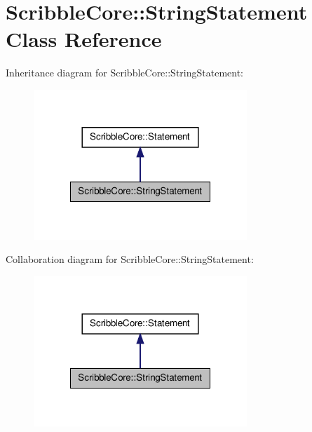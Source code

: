 \hypertarget{class_scribble_core_1_1_string_statement}{\section{Scribble\-Core\-:\-:String\-Statement Class Reference}
\label{class_scribble_core_1_1_string_statement}
}


Inheritance diagram for Scribble\-Core\-:\-:String\-Statement\-:
\nopagebreak
\begin{figure}[H]
\begin{center}
\leavevmode
\includegraphics[width=228pt]{class_scribble_core_1_1_string_statement__inherit__graph}
\end{center}
\end{figure}


Collaboration diagram for Scribble\-Core\-:\-:String\-Statement\-:
\nopagebreak
\begin{figure}[H]
\begin{center}
\leavevmode
\includegraphics[width=228pt]{class_scribble_core_1_1_string_statement__coll__graph}
\end{center}
\end{figure}
